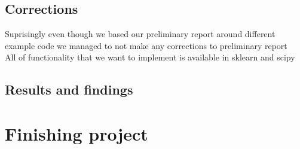 \documentclass[12pt]{article}
\begin{document}
\subsection{Corrections}
Suprisingly even though we based our preliminary report around different example code we managed to not make any corrections to preliminary report \\ 
All of functionality that we want to implement is available in sklearn and scipy 
\subsection{Results and findings}

\section{Finishing project}
\end{document}
